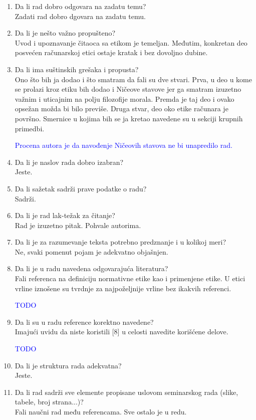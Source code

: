\documentclass[a4paper]{report}
\newcommand{\odgovor}[1]{\textcolor{blue}{#1}}
\begin{document}
\begin{enumerate}
\item Da li rad dobro odgovara na zadatu temu?\\
Zadati rad dobro dgovara na zadatu temu.
\item Da li je nešto važno propušteno?\\
Uvod i upoznavanje čitaoca sa etikom je temeljan. Međutim, konkretan deo posvećen računarskoj etici ostaje kratak i bez dovoljno dubine.
\item Da li ima suštinskih grešaka i propusta?\\
Ono što bih ja dodao i što smatram da fali su dve stvari. Prva, u deo u kome se prolazi kroz etiku bih dodao i Ničeove stavove jer ga smatram izuzetno važnim i uticajnim na polju filozofije morala. 
Premda je taj deo i ovako opsežan možda bi bilo previše. Druga stvar, deo oko etike računara je površno. Smernice u kojima bih se ja kretao navedene su u sekciji krupnih primedbi.

\odgovor{Procena autora je da navođenje Ničeovih stavova ne bi unapredilo rad.}

\item Da li je naslov rada dobro izabran?\\
Jeste.
\item Da li sažetak sadrži prave podatke o radu?\\
Sadrži.
\item Da li je rad lak-težak za čitanje?\\
Rad je izuzetno pitak. Pohvale autorima.
\item Da li je za razumevanje teksta potrebno predznanje i u kolikoj meri?\\
Ne, svaki pomenut pojam je adekvatno objašnjen.
\item Da li je u radu navedena odgovarajuća literatura?\\
Fali referenca na definiciju normativne etike kao i primenjene etike. U etici vrline iznošene su tvrdnje za 
najpoželjnije vrline bez ikakvih referenci.

\odgovor{TODO}

\item Da li su u radu reference korektno navedene?\\
Imajući uvidu da niste koristili [8] u celosti navedite korišćene delove.

\odgovor{TODO}

\item Da li je struktura rada adekvatna?\\
Jeste.
\item Da li rad sadrži sve elemente propisane uslovom seminarskog rada (slike, tabele, broj strana...)?\\
Fali naučni rad među referencama. Sve ostalo je u redu.


\end{enumerate}
\end{document}
